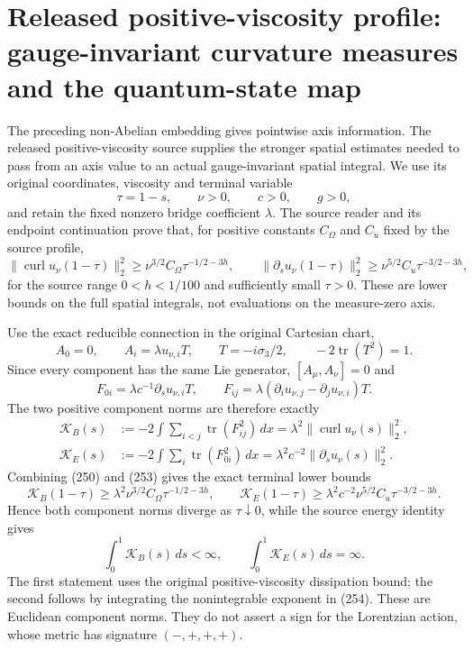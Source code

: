 \section{Released positive-viscosity profile: gauge-invariant curvature measures and the quantum-state map}
\label{sec:released-profile-measures}

The preceding non-Abelian embedding gives pointwise axis information.  The released positive-viscosity source supplies the stronger spatial estimates needed to pass from an axis value to an actual gauge-invariant spatial integral.  We use its original coordinates, viscosity and terminal variable
\[
  \tau=1-s,\qquad \nu>0,\qquad c>0,\qquad g>0,
\]
and retain the fixed nonzero bridge coefficient $\lambda$.  The source reader and its endpoint continuation prove that, for positive constants $C_\Omega$ and $C_{\dot u}$ fixed by the source profile,
\[
 \|\operatorname{curl}u_\nu(1-\tau)\|_2^2
 \ge \nu^{3/2}C_\Omega\tau^{-1/2-3h},\qquad
 \|\partial_su_\nu(1-\tau)\|_2^2
 \ge \nu^{5/2}C_{\dot u}\tau^{-3/2-3h},
 \tag{250}
\]
for the source range $0<h<1/100$ and sufficiently small $\tau>0$.  These are lower bounds on the full spatial integrals, not evaluations on the measure-zero axis.

Use the exact reducible connection in the original Cartesian chart,
\[
 A_0=0,\qquad A_i=\lambda u_{\nu,i}T,
 \qquad T=-i\sigma_3/2,
 \qquad -2\operatorname{tr}(T^2)=1.
 \tag{251}
\]
Since every component has the same Lie generator, $[A_\mu,A_\nu]=0$ and
\[
 F_{0i}=\lambda c^{-1}\partial_su_{\nu,i}T,
 \qquad
 F_{ij}=\lambda(\partial_i u_{\nu,j}-\partial_j u_{\nu,i})T.
 \tag{252}
\]
The two positive component norms are therefore exactly
\[
\begin{aligned}
 \mathcal K_B(s)&:=-2\int\sum_{i<j}\operatorname{tr}(F_{ij}^2)\,dx
      =\lambda^2\|\operatorname{curl}u_\nu(s)\|_2^2,\\
 \mathcal K_E(s)&:=-2\int\sum_i\operatorname{tr}(F_{0i}^2)\,dx
      =\lambda^2c^{-2}\|\partial_su_\nu(s)\|_2^2.
\end{aligned}
\tag{253}
\]
Combining (250) and (253) gives the exact terminal lower bounds
\[
 \mathcal K_B(1-\tau)\ge\lambda^2\nu^{3/2}C_\Omega\tau^{-1/2-3h},\qquad
 \mathcal K_E(1-\tau)\ge\lambda^2c^{-2}\nu^{5/2}C_{\dot u}\tau^{-3/2-3h}.
 \tag{254}
\]
Hence both component norms diverge as $\tau\downarrow0$, while the source energy identity gives
\[
 \int_0^1\mathcal K_B(s)\,ds<\infty,
 \qquad
 \int_0^1\mathcal K_E(s)\,ds=\infty.
 \tag{255}
\]
The first statement uses the original positive-viscosity dissipation bound; the second follows by integrating the nonintegrable exponent in (254).  These are Euclidean component norms.  They do not assert a sign for the Lorentzian action, whose metric has signature $(-,+,+,+)$.

